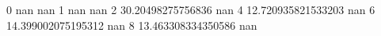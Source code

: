 0 nan nan
1 nan nan
2 30.20498275756836 nan
4 12.720935821533203 nan
6 14.399002075195312 nan
8 13.463308334350586 nan
